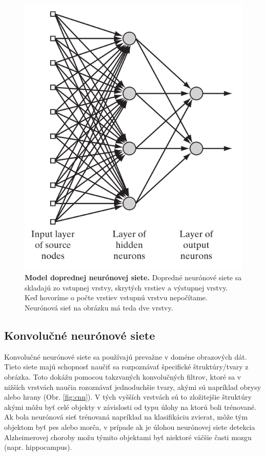 \begin{figure}[h!]
    \centering
    \includegraphics[scale=1]{assets/images/ff_nn.png}
    \caption{\textbf{Model doprednej neurónovej siete.} \cite{haykin2009neural} Dopredné neurónové siete sa skladajú zo vstupnej vrstvy, skrytých vrstiev a výstupnej vrstvy. Keď hovoríme o počte vrstiev vstupnú vrstvu nepočítame. Neurónová sieť na obrázku má teda dve vrstvy.}
    \label{fig:ff_nn}
\end{figure}

\subsection{Konvolučné neurónové siete}

Konvolučné neurónové siete sa používajú prevažne v doméne obrazových dát. Tieto siete majú schopnosť naučiť sa rozpoznávať špecifické štruktúry/tvary z obrázka. Toto dokážu pomocou takzvaných konvolučných filtrov, ktoré sa v nižších vrstvách naučia rozoznávať jednoduchšie tvary, akými sú napríklad obrysy alebo hrany (Obr. \ref{fig:cnn}). V tých vyšších vrstvách sú to zložitejšie štruktúry akými môžu byť celé objekty v závislosti od typu úlohy na ktorú boli trénované. Ak bola neurónová sieť trénovaná napríklad na klasifikáciu zvierat, môže tým objektom byť pes alebo morča, v prípade ak je úlohou neurónovej siete detekcia Alzheimerovej choroby možu týmito objektami byť niektoré väčšie časti mozgu (napr. hippocampus).

